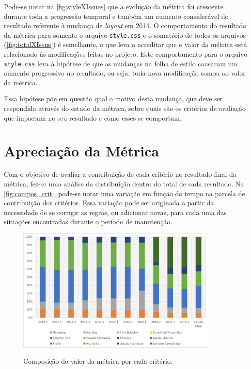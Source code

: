 Pode-se notar na \autoref{fig:styleXIssues} que a evolução da métrica foi crescente durante toda a progressão temporal e também um aumento considerável do resultado referente à mudança de \textit{layout} em 2014.
O comportamento do resultado da métrica para somente o arquivo \texttt{style.css} e o somatório de todos os arquivos (\autoref{fig:totalXIssue}) é semelhante, o que leva a acreditar que o valor da métrica está relacionado às modificações feitas no projeto. Este comportamento para o arquivo \texttt{style.css} leva à hipótese de que as mudanças na folha de estilo causaram um aumento progressivo no resultado, ou seja, toda nova modificação somou ao valor da métrica.

Essa hipótese põe em questão qual o motivo desta mudança, que deve ser respondida através do estudo da métrica, sobre quais são os critérios de avaliação que impactam no seu resultado e como esses se comportam. 

\section{Apreciação da Métrica}

Com o objetivo de avaliar a contribuição de cada critério no resultado final da métrica, fez-se uma análise da distribuição dentro do total de cada resultado. Na \autoref{fig:compos_crit}, pode-se notar uma variação em função do tempo na parcela de contribuição dos critérios. Essa variação pode ser originada a partir da necessidade de se corrigir as regras, ou adicionar novas, para cada uma das situações encontradas durante o período de manutenção.


\begin{figure}[!htb]
	\centering
	\caption{Composição do valor da métrica por cada critério.}
	\includegraphics[width=0.9\textwidth]{./04-figuras/composition_criteria}
	\label{fig:compos_crit}
\end{figure}

